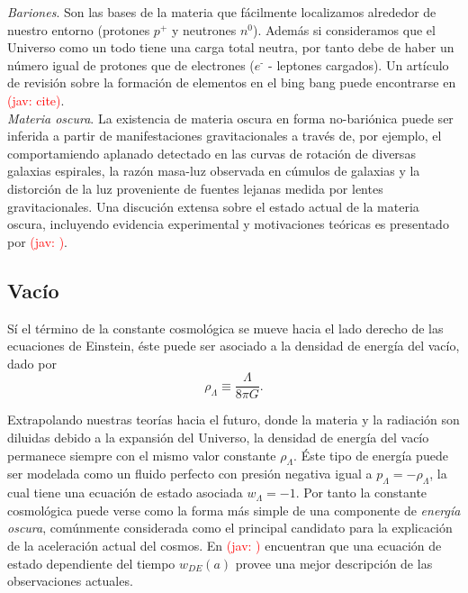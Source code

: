 \documentclass[10.5pt,prb,
               showpacs,            %
               preprintnumbers,     %
               aps,                 %
               prl,          	    %
               letterpaper,             %
               superscriptaddress,      %
               nofootinbib,         %
               tightenlines,        %
               floats,floatfix      %
               ,usenatbib]{revtex4-1}%
\def\beq{\begin{equation}}
\def\eeq{\end{equation}}
\newcommand{\jav}[1]{\textcolor{red}{(jav: #1)}}
\begin{document}
\textit{Bariones}. Son las bases de la materia que f\'acilmente localizamos alrededor de nuestro entorno 
(protones $p^\texttt{+}$ y neutrones $n^0$).
Adem\'as si consideramos que el Universo como un todo tiene una carga total neutra, por tanto debe de haber 
un n\'umero igual de protones que de electrones ($e^\texttt{-}$ - leptones cargados). 
Un art\'iculo de revisi\'on sobre la formaci\'on de elementos en el bing bang puede encontrarse en \jav{cite{}}.
\\



\textit{Materia oscura}. La existencia de materia oscura en forma no-bari\'onica puede ser inferida a 
partir de manifestaciones gravitacionales a trav\'es de, por ejemplo, el comportamiendo 
aplanado detectado en las curvas de rotaci\'on de diversas galaxias espirales, la
raz\'on masa-luz observada en c\'umulos de galaxias y la distorci\'on de la luz proveniente 
de fuentes lejanas medida por lentes gravitacionales.
 Una discuci\'on extensa sobre el estado actual de la materia oscura, incluyendo evidencia experimental
y motivaciones te\'oricas es presentado por \jav{\cite{}}.


\subsection*{Vac\'io} 


S\'i el t\'ermino de la constante cosmol\'ogica se mueve hacia el lado derecho de las ecuaciones de Einstein, 
\'este puede ser asociado a la densidad de energ\'ia del vac\'io, dado por 
%
	\beq
		\rho_\Lambda \equiv \frac{\Lambda}{8\pi G}.
	\eeq

\noindent
Extrapolando nuestras teor\'ias hacia el futuro, donde la materia y la radiaci\'on son diluidas debido a la expansi\'on del Universo, 
la densidad de energ\'ia del vac\'io permanece siempre con el mismo valor constante $\rho_\Lambda$.
\'Este tipo de energ\'ia  puede ser modelada como un fluido perfecto con presi\'on negativa igual a $p_\Lambda =-\rho_\Lambda$,
la cual tiene una ecuaci\'on de estado asociada $w_\Lambda=-1$. 
Por tanto la constante cosmol\'ogica puede verse como la forma m\'as simple de una componente de \textit{energ\'ia oscura}, 
com\'unmente considerada como el principal candidato para la explicaci\'on de la aceleraci\'on actual del cosmos.
En \jav{\cite{}} encuentran que una ecuaci\'on de estado dependiente del tiempo $w_{DE}(a)$ provee una mejor descripci\'on de las
observaciones actuales. 
\end{document}
